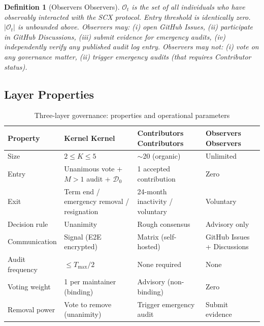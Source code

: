 \documentclass[12pt,a4paper]{article}
\newtheorem{definition}[theorem]{Definition}
\theoremstyle{definition}
\newcommand{\Observers}{\mathcal{O}}
\newcommand{\GzeroDecl}{\mathcal{D}_{0}}
\begin{document}
\begin{definition}[Observers Observers]
\label{def:observers}
$\Observers_t$ is the set of all individuals who have observably interacted with the SCX protocol. Entry threshold is identically zero. $|\Observers_t|$ is unbounded above. Observers may: (i) open GitHub Issues, (ii) participate in GitHub Discussions, (iii) submit evidence for emergency audits, (iv) independently verify any published audit log entry. Observers may not: (i) vote on any governance matter, (ii) trigger emergency audits (that requires Contributor status).
\end{definition}
\subsection{Layer Properties}
\begin{table}[htbp]
\centering
\caption{Three-layer governance: properties and operational parameters}
\label{tab:layers}
\begin{tabular}{p{2.5cm}p{3.2cm}p{3.2cm}p{4cm}}
\toprule
\textbf{Property} & \textbf{Kernel Kernel} & \textbf{Contributors Contributors} & \textbf{Observers Observers} \\
\midrule
Size  & $2 \leq K \leq 5$ & $\sim$20 (organic) & Unlimited  \\
\midrule
Entry  & Unanimous vote + $M>1$ audit + $\GzeroDecl$ & 1 accepted contribution & Zero  \\
\midrule
Exit  & Term end / emergency removal / resignation & 24-month inactivity / voluntary & Voluntary \\
\midrule
Decision rule  & Unanimity  & Rough consensus & Advisory only \\
\midrule
Communication  & Signal (E2E encrypted) & Matrix (self-hosted) & GitHub Issues + Discussions \\
\midrule
Audit frequency & $\leq T_{\max}/2$ & None required & None \\
\midrule
Voting weight  & 1 per maintainer (binding) & Advisory (non-binding) & Zero \\
\midrule
Removal power  & Vote to remove (unanimity) & Trigger emergency audit & Submit evidence \\
\bottomrule
\end{tabular}
\end{table}
\end{document}
